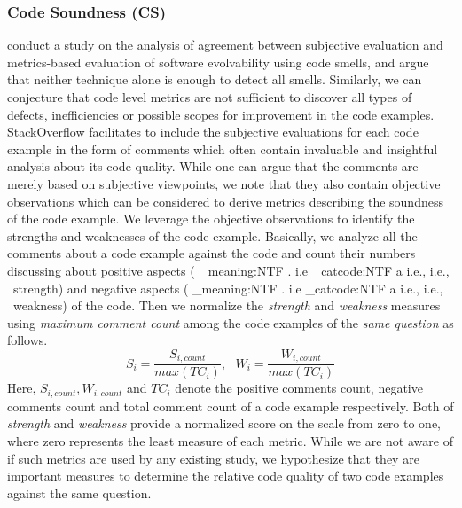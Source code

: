 \documentclass{sig-alternate}
\makeatletter
\newcommand\latinabbrev[1]{
  \peek_meaning:NTF . {%
    #1\@}%
  { \peek_catcode:NTF a {%
      #1., \@ }%
    {#1., \@}}}
\def\ie{\latinabbrev{i.e}}
\makeatother
\begin{document}
\subsubsection{Code Soundness (CS)}
\citet{subjective} conduct a study on the analysis of agreement between subjective evaluation and metrics-based evaluation of software evolvability using code smells, and argue that neither technique alone is enough to detect all smells. Similarly, we can conjecture that code level metrics are not sufficient to discover all types of defects, inefficiencies or possible scopes for improvement in the code examples. StackOverflow facilitates to include the subjective evaluations for each code example in the form of comments which often contain invaluable and insightful analysis about its code quality. While one can argue that the comments are merely based on subjective viewpoints, we note that they also contain objective observations which can be considered to derive metrics describing the soundness of the code example. We leverage the objective observations to identify the strengths and weaknesses of the code example. Basically, we analyze all the comments about a code example against the code and count their numbers discussing about positive aspects (\ie\ strength) and negative aspects (\ie\ weakness) of the code. Then we normalize the \emph{strength} and \emph{weakness} measures using \emph{maximum comment count} among the code examples of the \emph{same question} as follows.
\begin{equation}
S_{i}=\frac{S_{i, count}}{max(TC_{i})},~~~ W_{i}=\frac{W_{i, count}}{max(TC_{i})}
\end{equation}
Here, $S_{i, count}, W_{i, count}$ and $TC_{i}$ denote the positive comments count, negative comments count and total comment count of a code example respectively. Both of \emph{strength} and \emph{weakness} provide a normalized score on the scale from zero to one, where zero represents the least measure of each metric. While we are not aware of if such metrics are used by any existing study, we hypothesize that they are important measures to determine the relative code quality of two code examples against the same question.
\end{document}
